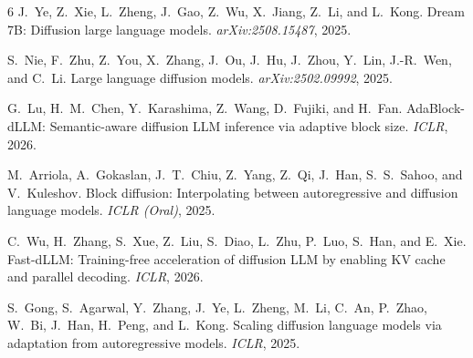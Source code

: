 \documentclass[11pt]{article}
\begin{document}
\begin{thebibliography}{6}
J.~Ye, Z.~Xie, L.~Zheng, J.~Gao, Z.~Wu, X.~Jiang, Z.~Li, and L.~Kong.
Dream 7B: Diffusion large language models. \textit{arXiv:2508.15487}, 2025.

S.~Nie, F.~Zhu, Z.~You, X.~Zhang, J.~Ou, J.~Hu, J.~Zhou, Y.~Lin, J.-R.~Wen, and C.~Li.
Large language diffusion models. \textit{arXiv:2502.09992}, 2025.

G.~Lu, H.~M.~Chen, Y.~Karashima, Z.~Wang, D.~Fujiki, and H.~Fan.
AdaBlock-dLLM: Semantic-aware diffusion LLM inference via adaptive block size. \textit{ICLR}, 2026.

M.~Arriola, A.~Gokaslan, J.~T.~Chiu, Z.~Yang, Z.~Qi, J.~Han, S.~S.~Sahoo, and V.~Kuleshov.
Block diffusion: Interpolating between autoregressive and diffusion language models. \textit{ICLR (Oral)}, 2025.

C.~Wu, H.~Zhang, S.~Xue, Z.~Liu, S.~Diao, L.~Zhu, P.~Luo, S.~Han, and E.~Xie.
Fast-dLLM: Training-free acceleration of diffusion LLM by enabling KV cache and parallel decoding. \textit{ICLR}, 2026.

S.~Gong, S.~Agarwal, Y.~Zhang, J.~Ye, L.~Zheng, M.~Li, C.~An, P.~Zhao, W.~Bi, J.~Han, H.~Peng, and L.~Kong.
Scaling diffusion language models via adaptation from autoregressive models. \textit{ICLR}, 2025.
\end{thebibliography}
\end{document}
